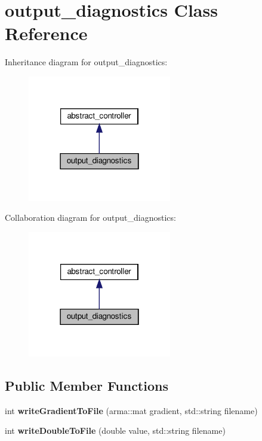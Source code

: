 \hypertarget{classoutput__diagnostics}{}\section{output\+\_\+diagnostics Class Reference}
\label{classoutput__diagnostics}


Inheritance diagram for output\+\_\+diagnostics\+:\nopagebreak
\begin{figure}[H]
\begin{center}
\leavevmode
\includegraphics[width=178pt]{classoutput__diagnostics__inherit__graph}
\end{center}
\end{figure}


Collaboration diagram for output\+\_\+diagnostics\+:\nopagebreak
\begin{figure}[H]
\begin{center}
\leavevmode
\includegraphics[width=178pt]{classoutput__diagnostics__coll__graph}
\end{center}
\end{figure}
\subsection*{Public Member Functions}
\begin{DoxyCompactItemize}
\item 
\mbox{\label{classoutput__diagnostics_a397079340ca3f8f1d03d46221739c542}} 
int {\bfseries write\+Gradient\+To\+File} (arma\+::mat gradient, std\+::string filename)
\item 
\mbox{\label{classoutput__diagnostics_a3c36ad7c103a2003087b501fc8dded79}} 
int {\bfseries write\+Double\+To\+File} (double value, std\+::string filename)
\end{DoxyCompactItemize}



